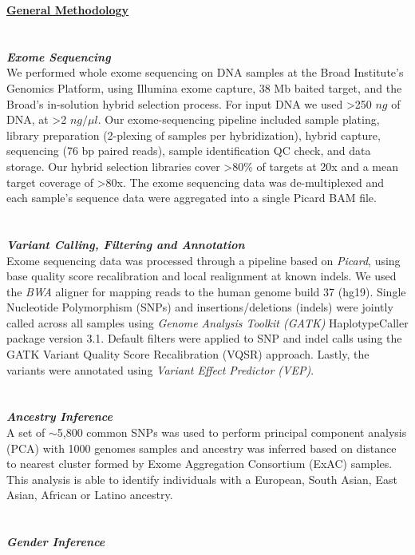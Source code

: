 {\Large \textbf{\underline{General Methodology}}}
\\ \\ \\
{\large \textbf{\textit{Exome Sequencing}}}
\\
We performed whole exome sequencing on DNA samples at the Broad Institute's Genomics Platform, using Illumina exome capture, 38 Mb baited target, and the Broad's in-solution 
hybrid selection process. For input DNA we used \textgreater250 $ng$ of DNA, at \textgreater2 $ng/\mu l$. Our exome-sequencing pipeline included sample plating, library preparation (2-plexing of samples 
per hybridization), hybrid capture, sequencing (76 bp paired reads), sample identification QC check, and data storage. Our hybrid selection libraries cover \textgreater80\% of targets at 
20x and a mean target coverage of \textgreater80x. The exome sequencing data was de-multiplexed and each sample's sequence data were aggregated into a single Picard BAM file.
\\ \\ \\
{\large \textbf{\textit{Variant Calling, Filtering and Annotation}}}
\\
Exome sequencing data was processed through a pipeline based on \textit{Picard}, using base quality score recalibration and local 
realignment at known indels. We used the \textit{BWA} aligner for mapping reads to the human genome build 37 (hg19). Single Nucleotide Polymorphism (SNPs) 
and insertions/deletions (indels) were jointly called across all samples using \textit{Genome Analysis Toolkit (GATK)} HaplotypeCaller package version 3.1. 
Default filters were applied to SNP and indel calls using the GATK Variant Quality Score Recalibration (VQSR) approach. 
Lastly, the variants were annotated using \textit{Variant Effect Predictor (VEP)}.
\\ \\ \\
{\large \textbf{\textit{Ancestry Inference}}}
\\
A set of $\sim$5,800 common SNPs was used to perform principal component analysis (PCA) with 1000 genomes samples and ancestry was inferred based on distance to nearest 
cluster formed by Exome Aggregation Consortium (ExAC) samples. This analysis is able to identify individuals with a European, South Asian, East Asian, African or 
Latino ancestry.
\\ \\ \\
{\large \textbf{\textit{Gender Inference}}}
